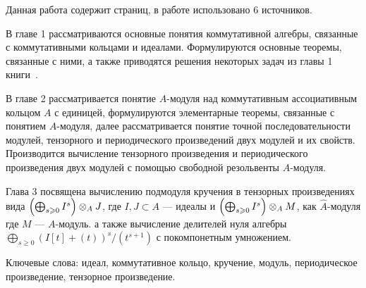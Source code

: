     Данная работа содержит \pageref{LastPage} страниц, в работе использовано 6 источников.

    В главе 1 рассматриваются основные понятия коммутативной алгебры, связанные с коммутативными
    кольцами и идеалами. Формулируются основные теоремы, связанные с ними, а также приводятся 
    решения некоторых задач из главы 1 книги~\cite{A-M}. 

    В главе 2 рассматривается понятие $A$-модуля 
    над коммутативным ассоциативным кольцом $A$ с единицей, формулируются элементарные теоремы, связанные с понятием $A$-модуля, далее
    рассматривается понятие точной последовательности модулей, тензорного и периодического 
    произведений двух модулей и их свойств. Производится вычисление тензорного произведения 
    и периодического произведения двух модулей  с помощью свободной резольвенты $A$-модуля. 
    
    Глава 3 посвящена вычислению подмодуля кручения в тензорных произведениях вида 
    $\left(\bigoplus_{s \geqslant 0} I^s \right) \otimes_A J$, где $I, J \subset A$ --- идеалы и 
    $\left(\bigoplus_{s \geqslant 0} I^s \right) \otimes_A M$, как $\hat A$-модуля где $M$ --- $A$-модуль.
    а также вычисление делителей нуля алгебры 
    $\bigoplus_{s \geq 0}{(I[t] + (t))^s / (t^{s + 1})}$ с покомпонетным умножением.

    Ключевые слова: идеал,
    коммутативное кольцо,
    кручение,
    модуль,
    периодическое произведение,
    тензорное произведение.
    
